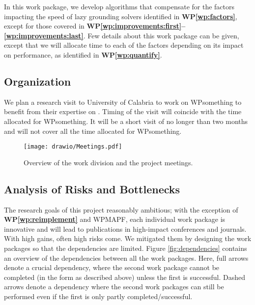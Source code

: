 \documentclass[a4paper,11pt]{article}
\newcommand{\wasp}{\logicname{wasp}}
\newcommand\WPref[1]{\textbf{WP\ref{#1}}}
\begin{document}
\begin{WP} \label{wp:algo:other}
In this work package, we develop algorithms that compensate for the factors impacting the speed of lazy grounding solvers identified in \WPref{wp:factors}, except for those covered in \textbf{WP\ref{wp:improvements:first}--\ref{wp:improvements:last}}. 
Few details about this work package can be given, except that we will allocate time to each of the factors depending on its impact on performance, as identified in \WPref{wp:quantify}.
\end{WP}



\subsection*{Organization}\label{sec:org}
We plan a research visit to University of Calabria to work on WPsomething to benefit from their expertise on \wasp. Timing of the visit will coincide with the time allocated for WPsomething. It will be a short visit of no longer than two months and will not cover all the time allocated for WPsomething.




\begin{figure}[t]
\hspace{-0.12\textwidth}\texttt{[image: drawio/Meetings.pdf]}
\caption{Overview of the work division and the project meetings. }
\label{fig:overview}
\end{figure}




\subsection*{Analysis of Risks and Bottlenecks}
The research goals of this project reasonably ambitious; with the exception of \WPref{wp:reimplement} and WPMAPF, each individual work package is innovative and will lead to publications in high-impact conferences and journals.
With high gains, often high risks come. We mitigated them by designing the work packages so that the dependencies are limited. 
Figure \ref{fig:dependencies} contains an overview of the dependencies between all the work packages.  Here, full arrows denote a crucial dependency, where the second work package cannot be completed (in the form as described above) unless the first is successful. Dashed arrows denote a dependency where the second work packages can still be performed even if the first is only partly completed/successful.  
\end{document}
